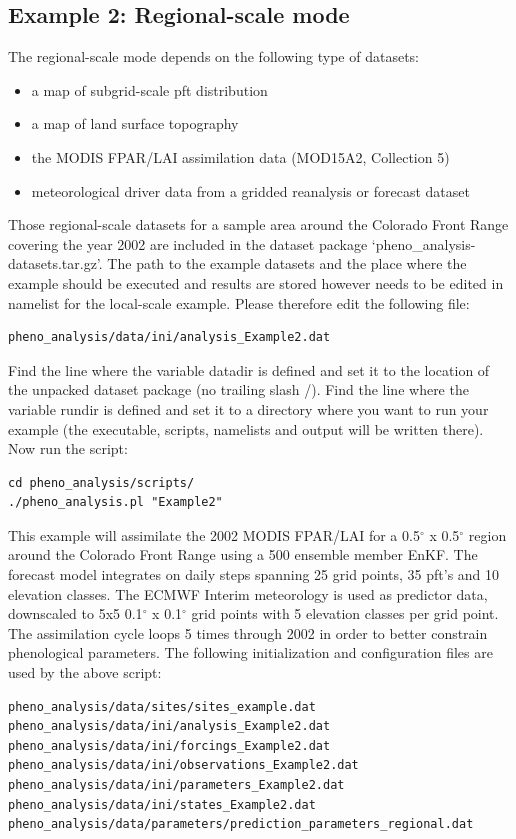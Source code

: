\documentclass[a4paper,12pt]{article}
\newcommand{\degree}{$^{\circ}$ }
\begin{document}
\subsection{Example 2: Regional-scale mode}
The regional-scale mode depends on the following type of datasets:
\begin{itemize} 
\item a map of subgrid-scale pft distribution
\item a map of land surface topography
\item the MODIS FPAR/LAI assimilation data (MOD15A2, Collection 5)
\item meteorological driver data from a gridded reanalysis or forecast dataset
\end{itemize}
Those regional-scale datasets for a sample area around the Colorado Front Range covering the year 2002 are included in the dataset package `pheno\_analysis-datasets.tar.gz'. The path to the example datasets and the place where the example should be executed and results are stored however needs to be edited in namelist for the local-scale example. Please therefore edit the following file:
\begin{verbatim}
pheno_analysis/data/ini/analysis_Example2.dat
\end{verbatim}
Find the line where the variable datadir is defined and set it to the location of the unpacked dataset package (no trailing slash /). 
Find the line where the variable rundir is defined and set it to a directory where you want to run your example (the executable, scripts, namelists and output will be written there).
Now run the script:
\begin{verbatim}
cd pheno_analysis/scripts/
./pheno_analysis.pl "Example2"
\end{verbatim}
This example will assimilate the 2002 MODIS FPAR/LAI for a 0.5\degree x 0.5\degree region around the Colorado Front Range using a 500 ensemble member EnKF. The forecast model integrates on daily steps spanning 25 grid points, 35 pft's and 10 elevation classes. The ECMWF Interim meteorology is used as predictor data, downscaled to 5x5 0.1\degree x 0.1\degree grid points with 5 elevation classes per grid point. The assimilation cycle loops 5 times through 2002 in order to better constrain phenological parameters. The following initialization and configuration files are used by the above script:
\begin{verbatim}
pheno_analysis/data/sites/sites_example.dat
pheno_analysis/data/ini/analysis_Example2.dat
pheno_analysis/data/ini/forcings_Example2.dat
pheno_analysis/data/ini/observations_Example2.dat
pheno_analysis/data/ini/parameters_Example2.dat
pheno_analysis/data/ini/states_Example2.dat
pheno_analysis/data/parameters/prediction_parameters_regional.dat
\end{verbatim}
\end{document}
